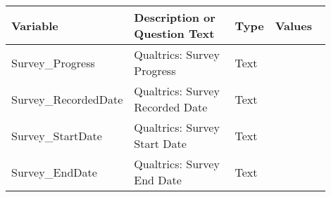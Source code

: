 \documentclass[12pt, letterpaper]{article}
\begin{document}
{\fontsize{8}{10}\selectfont
\renewcommand*{\arraystretch}{1.5}
\begin{longtable}{|p{0.2\linewidth}|p{0.4\linewidth}|p{0.1\linewidth}|p{0.2\linewidth}|}
\toprule
\textbf{Variable}	&	\textbf{Description or Question Text} & \textbf{Type}        & \textbf{Values                                                                                                                                                                                                                                 } \\* \midrule
\endhead
\bottomrule
\endfoot
\endlastfoot
Survey\_Progress             & Qualtrics: Survey Progress                                                                                                                                                                                                                                                          & Text        &                                                                                                                                                                                                                                         \\
Survey\_RecordedDate         & Qualtrics: Survey Recorded Date                                                                                                                                                                                                                                                    & Text        &                                                                                                                                                                                                                                         \\
Survey\_StartDate            & Qualtrics: Survey Start Date                                                                                                                                                                                                                                                        & Text        &                                                                                                                                                                                                                                         \\
Survey\_EndDate              & Qualtrics: Survey End Date                                                                                                                                                                                                                                                          & Text        &                                                                                                                                                                                                                                         \\

\end{longtable}}
\end{document}
